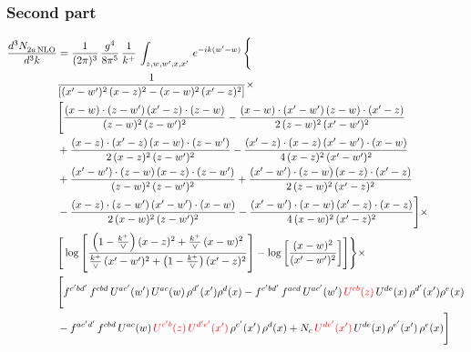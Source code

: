 \documentclass[9pt]{article}
\numberwithin{equation}{section}
\begin{document}
\subsubsection{Second part}
\begin{align}
    \frac{d^{3}N_{2a\,\rm NLO}^{\rm}}{d^{3}k}  & =  \frac{1}{(2\pi)^{3}}\, \frac{g^{4}}{8\pi^{5}}\,\frac{1}{k^{+}}\,\int_{z,w,w^{\prime},x,x'}\, e^{-ik(w^{\prime}-w)}\, \Bigg\{\notag \\
& \frac{1}{\left[(x'-w')^{2}\, (x-z)^{2}-(x-w)^{2}\, (x'-z)^{2}\right]}\times\,\notag \\ & \Bigg[\frac{(x-w)\cdot (z-w')\, (x'-z)\cdot (z-w)}{(z-w)^{2}\,(z-w')^{2}}-\frac{(x-w)\cdot (x'-w')\, (z-w)\cdot (x'-z)}{2\, (z-w)^{2}\, (x'-w')^{2}}\notag \\ & + \frac{(x-z)\cdot (x'-z)\, (x-w)\cdot (z-w')}{2\, (x-z)^{2}\, (z-w')^{2}}-\frac{(x'-z)\cdot (x-z)\, (x'-w')\cdot (x-w)}{4\, (x-z)^{2}\, (x'-w')^{2}}\notag \\ & + \frac{(x'-w')\cdot (z-w)\, (x-z)\cdot (z-w')}{(z-w)^{2}\,(z-w')^{2}}+\frac{(x'-w')\cdot (z-w)\, (x-z)\cdot (x'-z)}{2\, (z-w)^{2}\, (x'-z)^{2}}\notag \\ & - \frac{(x-z)\cdot (z-w')\, (x'-w')\cdot (x-w)}{2\, (x-w)^{2}\, (z-w')^{2}} -\frac{(x'-w')\cdot (x-w)\, (x'-z)\cdot (x-z)}{4\, (x-w)^{2}\, (x'-z)^{2}}\Bigg]\times\notag \\ &  \Bigg[\log{\left[\frac{\left(1-\frac{k^{+}}{\vee}\right)(x-z)^{2}+\frac{k^{+}}{\vee}\,(x-w)^{2}}{\frac{k^{+}}{\vee}\, (x'-w')^{2} + \left(1-\frac{k^{+}}{\vee}\right) (x'-z)^{2}}\right]}-\log{\left[\frac{(x-w)^{2}}{(x'-w')^{2}}\right]}\Bigg]\Bigg\} \times\, \notag \\ & \Bigg[f^{c'bd'}\,f^{cbd}\, U^{ac'}(w')\,U^{ac}(w)\,\rho^{d'}(x')\rho^{d}(x)- f^{c'bd'}\,f^{acd}\,U^{ac'}(w')\,{\color{red}U^{cb}(z)}\,U^{de}(x)\,\rho^{d'}(x')\rho^{e}(x) \notag \\ & -f^{ac'd'}\,f^{cbd}\,U^{ac}(w)\,{\color{red}U^{c'b}(z)\,U^{d'e'}(x')}\,\rho^{e'}(x')\,\rho^{d}(x) +N_{c}\,{\color{red}U^{de'}(x')}\,U^{de}(x)\,\rho^{e'}(x')\,\rho^{e}(x)\Bigg]
\end{align}
\end{document}
